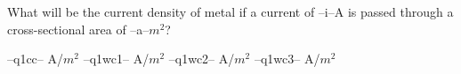\question
What will be the current density of metal if a current of --i--A is passed through a cross-sectional area of --a--$m^2$?


\begin{randomizechoices}
\correctchoice --q1cc-- A/$m^2$
\choice --q1wc1-- A/$m^2$
\choice --q1wc2-- A/$m^2$
\choice --q1wc3-- A/$m^2$
\end{randomizechoices}

